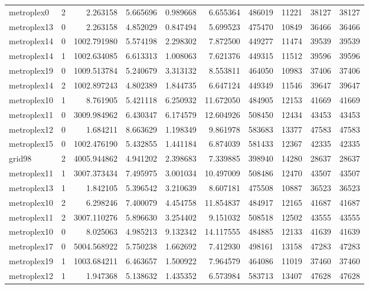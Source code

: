 \begin{longtable}{|l|r|r|r|r|r|r|r|r|r|}
metroplex0 & 2 & 2.263158 & 5.665696 & 0.989668 & 6.655364 & 486019 & 11221 & 38127 & 38127 \\
metroplex13 & 0 & 2.263158 & 4.852029 & 0.847494 & 5.699523 & 475470 & 10849 & 36466 & 36466 \\
metroplex14 & 0 & 1002.791980 & 5.574198 & 2.298302 & 7.872500 & 449277 & 11474 & 39539 & 39539 \\
metroplex14 & 1 & 1002.634085 & 6.613313 & 1.008063 & 7.621376 & 449315 & 11512 & 39596 & 39596 \\
metroplex19 & 0 & 1009.513784 & 5.240679 & 3.313132 & 8.553811 & 464050 & 10983 & 37406 & 37406 \\
metroplex14 & 2 & 1002.897243 & 4.802389 & 1.844735 & 6.647124 & 449349 & 11546 & 39647 & 39647 \\
metroplex10 & 1 & 8.761905 & 5.421118 & 6.250932 & 11.672050 & 484905 & 12153 & 41669 & 41669 \\
metroplex11 & 0 & 3009.984962 & 6.430347 & 6.174579 & 12.604926 & 508450 & 12434 & 43453 & 43453 \\
metroplex12 & 0 & 1.684211 & 8.663629 & 1.198349 & 9.861978 & 583683 & 13377 & 47583 & 47583 \\
metroplex15 & 0 & 1002.476190 & 5.432855 & 1.441184 & 6.874039 & 581433 & 12367 & 42335 & 42335 \\
grid98 & 2 & 4005.944862 & 4.941202 & 2.398683 & 7.339885 & 398940 & 14280 & 28637 & 28637 \\
metroplex11 & 1 & 3007.373434 & 7.495975 & 3.001034 & 10.497009 & 508486 & 12470 & 43507 & 43507 \\
metroplex13 & 1 & 1.842105 & 5.396542 & 3.210639 & 8.607181 & 475508 & 10887 & 36523 & 36523 \\
metroplex10 & 2 & 6.298246 & 7.400079 & 4.454758 & 11.854837 & 484917 & 12165 & 41687 & 41687 \\
metroplex11 & 2 & 3007.110276 & 5.896630 & 3.254402 & 9.151032 & 508518 & 12502 & 43555 & 43555 \\
metroplex10 & 0 & 8.025063 & 4.985213 & 9.132342 & 14.117555 & 484885 & 12133 & 41639 & 41639 \\
metroplex17 & 0 & 5004.568922 & 5.750238 & 1.662692 & 7.412930 & 498161 & 13158 & 47283 & 47283 \\
metroplex19 & 1 & 1003.684211 & 6.463657 & 1.500922 & 7.964579 & 464086 & 11019 & 37460 & 37460 \\
metroplex12 & 1 & 1.947368 & 5.138632 & 1.435352 & 6.573984 & 583713 & 13407 & 47628 & 47628 \\

\end{longtable}
